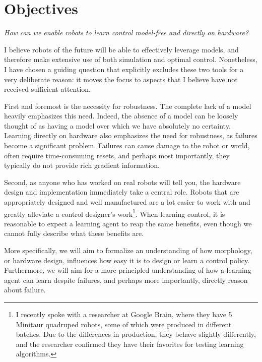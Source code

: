 \section{Objectives}
\emph{How can we enable robots to learn control model-free and directly on hardware?} \par
I believe robots of the future will be able to effectively leverage models, and therefore make extensive use of both simulation and optimal control.
Nonetheless, I have chosen a guiding question that explicitly excludes these two tools for a very deliberate reason: it moves the focus to aspects that I believe have not received sufficient attention. \par
First and foremost is the necessity for robustness. The complete lack of a model heavily emphasizes this need. Indeed, the absence of a model can be loosely thought of as having a model over which we have absolutely no certainty.
Learning directly on hardware also emphasizes the need for robustness, as failures become a significant problem. Failures can cause damage to the robot or world, often require time-consuming resets, and perhaps most importantly, they typically do not provide rich gradient information. \par
Second, as anyone who has worked on real robots will tell you, the hardware design and implementation immediately take a central role. Robots that are appropriately designed and well manufactured are a lot easier to work with and greatly alleviate a control designer's work\footnote{I recently spoke with a researcher at Google Brain, where they have 5 Minitaur quadruped robots, some of which were produced in different batches. Due to the differences in production, they behave slightly differently, and the researcher confirmed they have their favorites for testing learning algorithms.}. When learning control, it is reasonable to expect a learning agent to reap the same benefits, even though we cannot fully describe what these benefits are. \par

More specifically, we will aim to formalize an understanding of how morphology, or hardware design, influences how easy it is to design or learn a control policy. Furthermore, we will aim for a more principled understanding of how a learning agent can learn despite failures, and perhaps more importantly, directly reason about failure.


